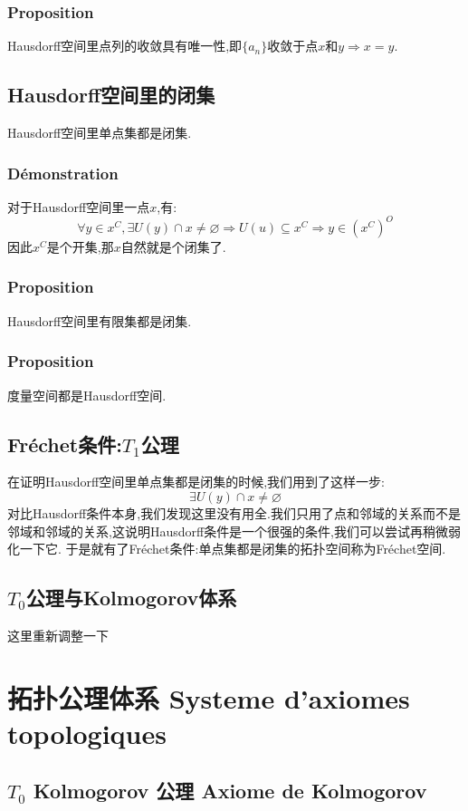 \documentclass[12pt, a4paper, oneside]{ctexbook}
\begin{document}
  \subsubsection{Proposition}
  Hausdorff空间里点列的收敛具有唯一性,即$\{a_n\}$收敛于点$x$和$y\Rightarrow x=y$.
  \subsection{Hausdorff空间里的闭集}
  Hausdorff空间里单点集都是闭集.
  \subsubsection{Démonstration}
  对于Hausdorff空间里一点$x$,有:
  $$
  \forall y\in x^C, \exists U(y)\cap x\neq\varnothing\Rightarrow U(u)\subseteq x^C\Rightarrow y\in(x^C)^O
  $$因此$x^C$是个开集,那$x$自然就是个闭集了.
  \subsubsection{Proposition}
  Hausdorff空间里有限集都是闭集.
  \subsubsection{Proposition}
  度量空间都是Hausdorff空间.

  \subsection{Fréchet条件:$T_1$公理}
  在证明Hausdorff空间里单点集都是闭集的时候,我们用到了这样一步:
  $$
  \exists U(y)\cap x\neq\varnothing
  $$
  对比Hausdorff条件本身,我们发现这里没有用全.我们只用了点和邻域的关系而不是邻域和邻域的关系,这说明Hausdorff条件是一个很强的条件,我们可以尝试再稍微弱化一下它.
  于是就有了Fréchet条件:单点集都是闭集的拓扑空间称为Fréchet空间.





  \subsection{$T_0$公理与Kolmogorov体系}
  这里重新调整一下

  \section{拓扑公理体系 Systeme d'axiomes topologiques}
  \subsection{$T_0$ Kolmogorov 公理 Axiome de Kolmogorov}
\end{document}
